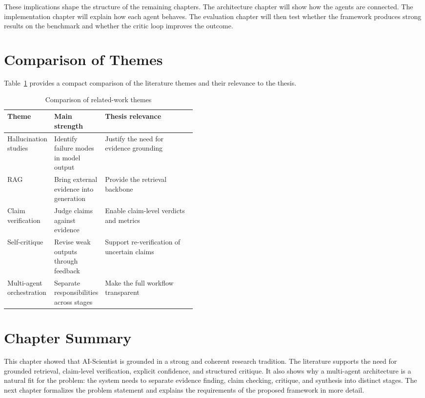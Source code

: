 These implications shape the structure of the remaining chapters. The architecture chapter will show how the agents are connected. The implementation chapter will explain how each agent behaves. The evaluation chapter will then test whether the framework produces strong results on the benchmark and whether the critic loop improves the outcome.

\section{Comparison of Themes}

Table~\ref{tab:related_work_comparison} provides a compact comparison of the literature themes and their relevance to the thesis.

\begin{table}[H]
\centering
\begin{tabularx}{\linewidth}{>{\raggedright\arraybackslash}p{0.22\linewidth} >{\raggedright\arraybackslash}p{0.23\linewidth} >{\raggedright\arraybackslash}X}
\toprule
Theme & Main strength & Thesis relevance \\
\midrule
Hallucination studies & Identify failure modes in model output & Justify the need for evidence grounding \\
RAG & Bring external evidence into generation & Provide the retrieval backbone \\
Claim verification & Judge claims against evidence & Enable claim-level verdicts and metrics \\
Self-critique & Revise weak outputs through feedback & Support re-verification of uncertain claims \\
Multi-agent orchestration & Separate responsibilities across stages & Make the full workflow transparent \\
\bottomrule
\end{tabularx}
\caption{Comparison of related-work themes}
\label{tab:related_work_comparison}
\end{table}

\section{Chapter Summary}

This chapter showed that AI-Scientist is grounded in a strong and coherent research tradition. The literature supports the need for grounded retrieval, claim-level verification, explicit confidence, and structured critique. It also shows why a multi-agent architecture is a natural fit for the problem: the system needs to separate evidence finding, claim checking, critique, and synthesis into distinct stages. The next chapter formalizes the problem statement and explains the requirements of the proposed framework in more detail.
